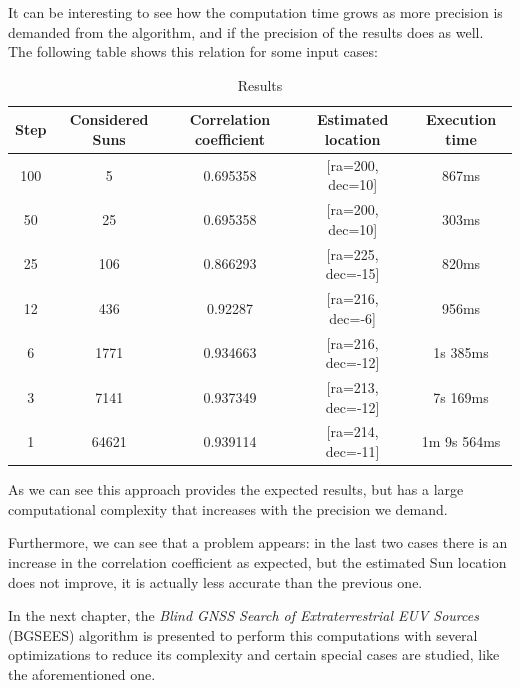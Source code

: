 It can be interesting to see how the computation time grows as more precision is demanded from the algorithm, and if the precision of the results does as well. The following table shows this relation for some input cases:

\begin{table}[h!]
	\centering
	\def\arraystretch{1.2}
	\begin{tabular}{|c c c c c|} 
		\hline
		Step & Considered Suns & Correlation coefficient & Estimated location & Execution time \\ [0.5ex] 
		\hline\hline
		100 & 5 & 0.695358 & [ra=200, dec=10] & 867ms \\
		\hline 
		50 & 25 & 0.695358 & [ra=200, dec=10] & 303ms \\
			\hline 
		25 & 106 & 0.866293 & [ra=225, dec=-15] & 820ms \\
			\hline 
		12 & 436 & 0.92287 & [ra=216, dec=-6] & 956ms \\
			\hline 
		6 & 1771 & 0.934663 & [ra=216, dec=-12] & 1s 385ms \\
			\hline 
		3 & 7141 & 0.937349 & [ra=213, dec=-12] & 7s 169ms \\
			\hline 
		1 & 64621 & 0.939114 & [ra=214, dec=-11] & 1m 9s 564ms \\
		\hline 
	\end{tabular}
	\caption{Results}
\end{table}

As we can see this approach provides the expected results, but has a large computational complexity that increases with the precision we demand. 

Furthermore, we can see that a problem appears: in the last two cases there is an increase in the correlation coefficient as expected, but the estimated Sun location does not improve, it is actually less accurate than the previous one.

In the next chapter, the \textit{Blind GNSS Search of Extraterrestrial EUV Sources} (BGSEES) algorithm is presented to perform this computations with several optimizations to reduce its complexity and certain special cases are studied, like the aforementioned one.
